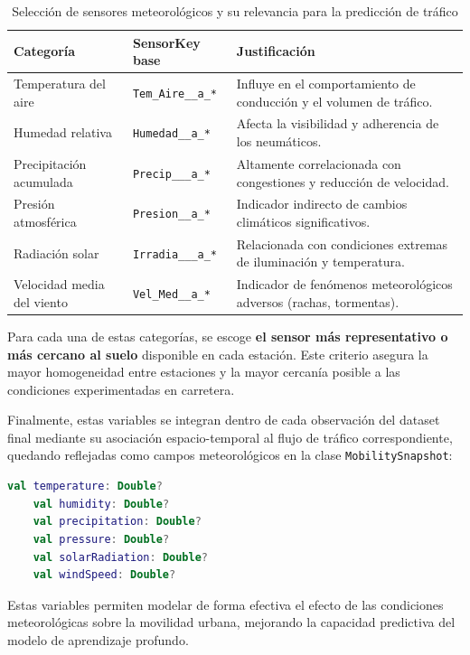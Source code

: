 \begin{table}[H]
	\centering
	\small
	\caption{Selección de sensores meteorológicos y su relevancia para la predicción de tráfico}
	\label{tab:seleccion_meteo}
	\begin{tabularx}{\textwidth}{l l X}
		\toprule
		\textbf{Categoría} & \textbf{SensorKey base} & \textbf{Justificación} \\
		\midrule
		Temperatura del aire & \texttt{Tem\_Aire\_\_a\_*} & Influye en el comportamiento de conducción y el volumen de tráfico. \\
		Humedad relativa & \texttt{Humedad\_\_a\_*} & Afecta la visibilidad y adherencia de los neumáticos. \\
		Precipitación acumulada & \texttt{Precip\_\_\_a\_*} & Altamente correlacionada con congestiones y reducción de velocidad. \\
		Presión atmosférica & \texttt{Presion\_\_a\_*} & Indicador indirecto de cambios climáticos significativos. \\
		Radiación solar & \texttt{Irradia\_\_\_a\_*} & Relacionada con condiciones extremas de iluminación y temperatura. \\
		Velocidad media del viento & \texttt{Vel\_Med\_\_a\_*} & Indicador de fenómenos meteorológicos adversos (rachas, tormentas). \\
		\bottomrule
	\end{tabularx}
\end{table}

Para cada una de estas categorías, se escoge \textbf{el sensor más representativo o más cercano al suelo} disponible en cada estación. Este criterio asegura la mayor homogeneidad entre estaciones y la mayor cercanía posible a las condiciones experimentadas en carretera.

Finalmente, estas variables se integran dentro de cada observación del dataset final mediante su asociación espacio-temporal al flujo de tráfico correspondiente, quedando reflejadas como campos meteorológicos en la clase \texttt{MobilitySnapshot}:

\begin{lstlisting}[language=Kotlin, caption={Variables meteorológicas integradas en MobilitySnapshot}]
	val temperature: Double?
	val humidity: Double?
	val precipitation: Double?
	val pressure: Double?
	val solarRadiation: Double?
	val windSpeed: Double?
\end{lstlisting}

Estas variables permiten modelar de forma efectiva el efecto de las condiciones meteorológicas sobre la movilidad urbana, mejorando la capacidad predictiva del modelo de aprendizaje profundo.

